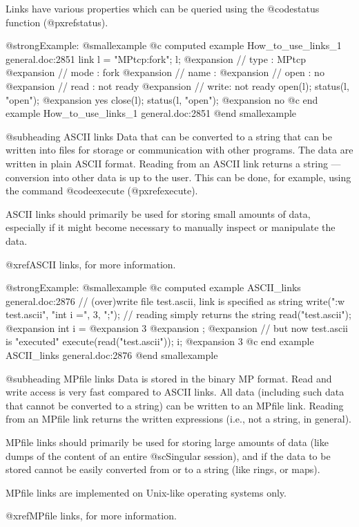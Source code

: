 {{{Links have various properties which can be queried using the
@code{status} function (@pxref{status}).

@strong{Example:}
@smallexample
@c computed example How_to_use_links_1 general.doc:2851 
  link l = "MPtcp:fork";
  l;
@expansion{} // type : MPtcp
@expansion{} // mode : fork
@expansion{} // name : 
@expansion{} // open : no
@expansion{} // read : not ready
@expansion{} // write: not ready
  open(l);
  status(l, "open");
@expansion{} yes
  close(l);
  status(l, "open");
@expansion{} no
@c end example How_to_use_links_1 general.doc:2851
@end smallexample

@subheading ASCII links
Data that can be converted to a string that can be written into files for
storage or communication with other programs. The data are written in
plain ASCII format. Reading from an ASCII link returns a string ---
conversion into other data is up to the user. This can be done, for
example, using the command @code{execute} (@pxref{execute}).

ASCII links should primarily be used for storing small amounts of data,
especially if it might become necessary to manually inspect or
manipulate the data.

@xref{ASCII links}, for more information.

@strong{Example:}
@smallexample
@c computed example ASCII_links general.doc:2876 
  // (over)write file test.ascii, link is specified as string
  write(":w test.ascii", "int i =", 3, ";");
  // reading simply returns the string
  read("test.ascii");
@expansion{} int i =
@expansion{} 3
@expansion{} ;
@expansion{} 
  // but now test.ascii is "executed"
  execute(read("test.ascii"));
  i;
@expansion{} 3
@c end example ASCII_links general.doc:2876
@end smallexample

@subheading MPfile links
Data is stored in the binary MP format.  Read and write access is very
fast compared to ASCII links.  All data (including such data that cannot
be converted to a string) can be written to an MPfile link.  Reading
from an MPfile link returns the written expressions (i.e., not a string,
in general).

MPfile links should primarily be used for storing large amounts of data
(like dumps of the content of an entire @sc{Singular} session), and if
the data to be stored cannot be easily converted from or to a string
(like rings, or maps).

MPfile links are implemented on Unix-like operating systems only.

@xref{MPfile links}, for more information.

}}}
